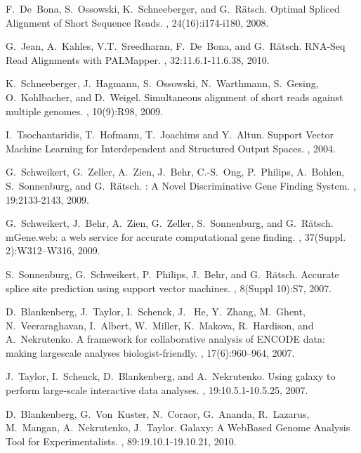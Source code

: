 \documentclass{article}
\begin{document}
\begin{thebibliography}{1}

  \newblock F.~De~Bona, S.~Ossowski, K.~Schneeberger, and G.~R{\"a}tsch.
  \newblock Optimal Spliced Alignment of Short Sequence Reads.
  , 24(16):i174-i180, 2008.

  \newblock G.~Jean, A.~Kahles, V.T.~Sreedharan, F.~De~Bona, and G.~R\"atsch.
  \newblock RNA-Seq Read Alignments with PALMapper.
  , 32:11.6.1-11.6.38, 2010.

  \newblock K.~Schneeberger, J.~Hagmann, S.~Ossowski, N.~Warthmann,
  S.~Gesing, O.~Kohlbacher, and D.~Weigel. 
  \newblock Simultaneous alignment of short reads against multiple genomes.
  , 10(9):R98, 2009.

  \newblock I.~Tsochantaridis, T.~Hofmann, T.~Joachims and Y.~Altun.
  \newblock Support Vector Machine Learning for Interdependent and Structured Output Spaces.
  , 2004.

  \newblock G.~Schweikert, G.~Zeller, A.~Zien, J.~Behr, C.-S.~Ong, P.~Philips,
  A.~Bohlen, S.~Sonnenburg, and G.~R\"atsch.
  : {A} Novel Discriminative Gene Finding System.
  , 19:2133-2143, 2009.

  \newblock G.~Schweikert, J.~Behr, A.~Zien, G.~Zeller, S.~Sonnenburg, and G.~R\"atsch.
  \newblock mGene.web: a web service for accurate computational gene
  finding. 
  , 37(Suppl. 2):W312–W316, 2009. 

  \newblock S.~Sonnenburg, G.~Schweikert, P.~Philips, J.~Behr, and
  G.~R{\"a}tsch. 
  \newblock Accurate splice site prediction using support vector machines.
  , 8(Suppl 10):S7, 2007.

  \newblock D.~Blankenberg, J.~Taylor, I.~Schenck, J.~ He, Y.~Zhang,
  M.~Ghent, N.~Veeraraghavan, I.~Albert, W.~Miller, K.~Makova, R.~Hardison, and A.~Nekrutenko.
  \newblock A framework for collaborative analysis of ENCODE data: making large­scale analyses biologist-friendly.
  , 17(6):960–964, 2007. 

  \newblock J.~Taylor, I.~Schenck, D.~Blankenberg, and A.~Nekrutenko.
  \newblock Using galaxy to perform large-scale interactive data
  analyses. 
  , 19:10.5.1-10.5.25, 2007. 

  \newblock D.~Blankenberg, G.~Von~Kuster, N.~Coraor, G.~Ananda,
  R.~Lazarus, M.~Mangan, A.~Nekrutenko, J.~Taylor.
  \newblock Galaxy: A Web­Based Genome Analysis Tool for Experimentalists.
  , 89:19.10.1-19.10.21, 2010.


  



\end{thebibliography}
%
%
%
\end{document}
